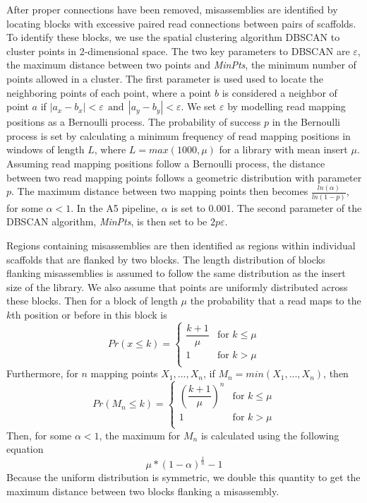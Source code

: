 \documentclass{bioinfo}
\begin{document}
After proper connections have been removed, misassemblies are identified by locating blocks with excessive 
paired read connections between pairs of scaffolds. To identify these blocks, we use the spatial clustering algorithm DBSCAN 
to cluster points in 2-dimensional space. The two key parameters to DBSCAN are $\varepsilon$, the maximum distance between 
two points and \emph{MinPts}, the minimum number of points allowed in a cluster. The first parameter is used used to locate 
the neighboring points of each point, where a point $b$ is considered a neighbor of point $a$ if $|a_x - b_x| < \varepsilon 
~~\mbox{and}~~ |a_y - b_y| < \varepsilon$. We set $\varepsilon$ by modelling read mapping positions as a Bernoulli process. 
The probability of success $p$ in the Bernoulli process is set by calculating a minimum frequency of read mapping positions
in windows of length $L$, where $L = max(1000,\mu)$ for a library with mean insert $\mu$. Assuming read mapping positions 
follow a Bernoulli process, the distance between two read mapping points follows a geometric distribution with parameter $p$.
The maximum distance between two mapping points then becomes $\frac{ln(\alpha)}{ln(1-p)}$, for some $\alpha < 1$. In the A5 
pipeline, $\alpha$ is set to 0.001. The second parameter of the DBSCAN algorithm, \emph{MinPts}, is then set to be 
$2p\varepsilon$.  

Regions containing misassemblies are then identified as regions within individual scaffolds that are flanked by two blocks.
The length distribution of blocks flanking misassemblies is assumed to follow the same distribution as the insert size of the
library. We also assume that points are uniformly distributed across these blocks. Then for a block of length $\mu$ the probability 
that a read maps to the $k$th position or before in this block is
\begin{equation}
	Pr(x \le k) = \begin{cases} 
					\dfrac{k+1}{\mu} & \text{for }k \le \mu \\
					1 & \text{for }k > \mu \\
				  \end{cases}
\end{equation} 
Furthermore, for $n$ mapping points $X_1,...,X_n$, if $M_n = min(X_1,...,X_n)$, then 
\begin{equation}
	Pr(M_n \le k) = \begin{cases} 
					\left ( \dfrac{k+1}{\mu} \right )^n & \text{for }k \le \mu \\
					1 & \text{for }k > \mu \\
				  \end{cases}
\end{equation}
Then, for some $\alpha < 1$, the maximum for $M_n$ is calculated using the following equation  
\begin{equation} 
	\mu*(1-\alpha)^\frac{1}{n} - 1 
\end{equation}
Because the uniform distribution is symmetric, we double this quantity to get the maximum distance between two blocks
flanking a misassembly. 
\end{document}

